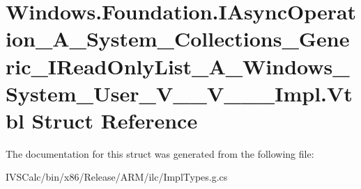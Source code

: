 \hypertarget{struct_windows_1_1_foundation_1_1_i_async_operation___a___system___collections___generic___i_rea677f139d4c7dd672a3505b85f35ec0b9}{}\section{Windows.\+Foundation.\+I\+Async\+Operation\+\_\+\+A\+\_\+\+System\+\_\+\+Collections\+\_\+\+Generic\+\_\+\+I\+Read\+Only\+List\+\_\+\+A\+\_\+\+Windows\+\_\+\+System\+\_\+\+User\+\_\+\+V\+\_\+\+\_\+\+V\+\_\+\+\_\+\+\_\+\+Impl.\+Vtbl Struct Reference}
\label{struct_windows_1_1_foundation_1_1_i_async_operation___a___system___collections___generic___i_rea677f139d4c7dd672a3505b85f35ec0b9}


The documentation for this struct was generated from the following file\+:\begin{DoxyCompactItemize}
\item 
I\+V\+S\+Calc/bin/x86/\+Release/\+A\+R\+M/ilc/Impl\+Types.\+g.\+cs\end{DoxyCompactItemize}
